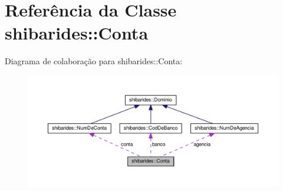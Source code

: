 \hypertarget{classshibarides_1_1Conta}{}\section{Referência da Classe shibarides\+:\+:Conta}
\label{classshibarides_1_1Conta}


Diagrama de colaboração para shibarides\+:\+:Conta\+:
\nopagebreak
\begin{figure}[H]
\begin{center}
\leavevmode
\includegraphics[width=350pt]{classshibarides_1_1Conta__coll__graph}
\end{center}
\end{figure}
